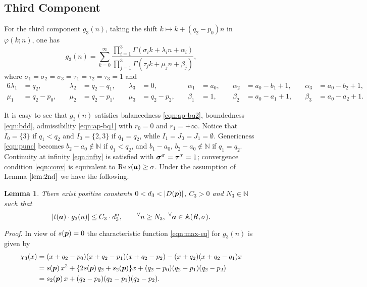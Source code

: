 \documentclass[a4paper,12pt]{article}
\theoremstyle{plain}
\newtheorem{lemma}[theorem]{Lemma}
\def\rRe{\mathrm{Re}}
\def\A{\mathbb{A}}
\def\N{\mathbb{N}}
\def\vG{\varGamma}
\def\ba{\mbox{\boldmath $a$}}
\def\bp{\mbox{\boldmath $p$}}
\def\bsigma{\mbox{\boldmath $\sigma$}}
\def\sbsigma{\mbox{\boldmath ${\scriptstyle \sigma}$}}
\def\btau{\mbox{\boldmath $\tau$}}
\def\sbtau{\mbox{\boldmath ${\scriptstyle \tau}$}}
\begin{document}
\subsection{Third Component} \label{subsec:3rd}
For the third component $g_3(n)$, taking the shift 
$k \mapsto k+(q_2-p_0)n$ in $\varphi(k; n)$, one has      
\[
g_3(n) = \sum_{k=0}^{\infty} \frac{\prod_{i=1}^3 
\vG(\sigma_i k+ \lambda_i n+ \alpha_i)}{\prod_{j=1}^3
\vG(\tau_j k+ \mu_j n +\beta_j)}, 
\]
where $\sigma_1 = \sigma_2 = \sigma_3 = \tau_1 = \tau_2 = \tau_3 = 1$ and 
\begin{alignat*}{6}
\lambda_1 &= q_2, \quad & \lambda_2 &= q_2-q_1, \quad & \lambda_3 &= 0, \quad &
\alpha_1 &= a_0, \quad & \alpha_2 &= a_0-b_1+1, \quad & \alpha_3 &= a_0-b_2+1, 
\\ 
\mu_1 &= q_2-p_0, \quad & \mu_2 &= q_2-p_1, \quad & \mu_3 &= q_2-p_2, \quad &
\beta_1 &= 1, \quad  &  \beta_2 &= a_0-a_1+1, \quad &  \beta_3 &= a_0-a_2+1.  
\end{alignat*}
\par
It is easy to see that $g_3(n)$ satisfies balancedness 
\eqref{eqn:ap-bq2}, boundedness \eqref{eqn:bdd}, admissibility 
\eqref{eqn:ap-bq1} with $r_0 = 0$ and $r_1 = +\infty$.  
Notice that $I_0 = \{3 \}$ if $q_1 < q_2$ and $I_0 = \{2, 3\}$ if 
$q_1 = q_2$, while $I_1 = J_0 = J_1 = \emptyset$. 
Genericness \eqref{eqn:punc} becomes $b_2-a_0 \not \in \N$ if $q_1 < q_2$,  
and $b_1-a_0$, $b_2-a_0 \not \in \N$ if $q_1 = q_2$.  
Continuity at infinity \eqref{eqn:infty} is satisfied with   
$\bsigma^{\sbsigma} = \btau^{\sbtau} = 1$; convergence 
condition \eqref{eqn:conv} is equivalent to $\rRe \, s(\ba) \ge \sigma$.  
Under the assumption of Lemma $\ref{lem:2nd}$ we have the following. 
\begin{lemma} \label{lem:3rd} 
There exist positive constants $0 < d_3 < |D(\bp)|$, $C_3 > 0$ and 
$N_3 \in \N$ such that 
\[
|t(\ba) \cdot g_3(n)| \le C_3 \cdot d_3^n, 
\qquad {}^{\forall} n \ge N_3, \, \, {}^{\forall}\ba \in \A(R, \sigma).   
\]
\end{lemma}
{\it Proof}.  
In view of $s(\bp) = 0$ the characteristic function 
\eqref{eqn:max-eq} for $g_3(n)$ is given by 
\begin{align*}
\chi_3(x) 
&= (x+q_2-p_0)(x+q_2-p_1)(x+q_2-p_2) - (x+q_2)(x+q_2-q_1)x \\
&= s(\bp) \, x^2 + \{ 2 s(\bp) \, q_2 + s_2(\bp) \} x 
+ (q_2-p_0)(q_2-p_1)(q_2-p_2) \\
&= s_2(\bp) \, x + (q_2-p_0)(q_2-p_1)(q_2-p_2).  
\end{align*}
\end{document}
